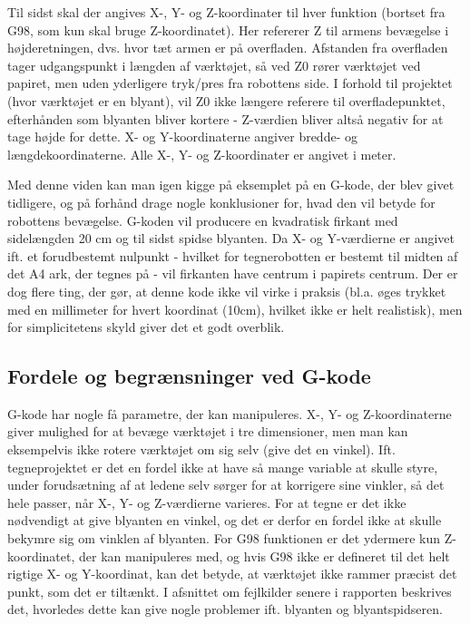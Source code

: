 Til sidst skal der angives X-, Y- og Z-koordinater til hver funktion (bortset fra G98, som kun skal bruge Z-koordinatet). Her refererer Z til armens bevægelse i højderetningen, dvs. hvor tæt armen er på overfladen. Afstanden fra overfladen tager udgangspunkt i længden af værktøjet, så ved Z0 rører værktøjet ved papiret, men uden yderligere tryk/pres fra robottens side. I forhold til projektet (hvor værktøjet er en blyant), vil Z0 ikke længere referere til overfladepunktet, efterhånden som blyanten bliver kortere - Z-værdien bliver altså negativ for at tage højde for dette. X- og Y-koordinaterne angiver bredde- og længdekoordinaterne. Alle X-, Y- og Z-koordinater er angivet i meter.

Med denne viden kan man igen kigge på eksemplet på en G-kode, der blev givet tidligere, og på forhånd drage nogle konklusioner for, hvad den vil betyde for robottens bevægelse. G-koden vil producere en kvadratisk firkant med sidelængden 20 cm og til sidst spidse blyanten. Da X- og Y-værdierne er angivet ift. et forudbestemt nulpunkt - hvilket for tegnerobotten er bestemt til midten af det A4 ark, der tegnes på - vil firkanten have centrum i papirets centrum. Der er dog flere ting, der gør, at denne kode ikke vil virke i praksis (bl.a. øges trykket med en millimeter for hvert koordinat (10cm), hvilket ikke er helt realistisk), men for simplicitetens skyld giver det et godt overblik.

\subsection{Fordele og begrænsninger ved G-kode}
G-kode har nogle få parametre, der kan manipuleres. X-, Y- og Z-koordinaterne giver mulighed for at bevæge værktøjet i tre dimensioner, men man kan eksempelvis ikke rotere værktøjet om sig selv (give det en vinkel). Ift. tegneprojektet er det en fordel ikke at have så mange variable at skulle styre, under forudsætning af at ledene selv sørger for at korrigere sine vinkler, så det hele passer, når X-, Y- og Z-værdierne varieres. For at tegne er det ikke nødvendigt at give blyanten en vinkel, og det er derfor en fordel ikke at skulle bekymre sig om vinklen af blyanten. For G98 funktionen er det ydermere kun Z-koordinatet, der kan manipuleres med, og hvis G98 ikke er defineret til det helt rigtige X- og Y-koordinat, kan det betyde, at værktøjet ikke rammer præcist det punkt, som det er tiltænkt. I afsnittet om fejlkilder senere i rapporten beskrives det, hvorledes dette kan give nogle problemer ift. blyanten og blyantspidseren.